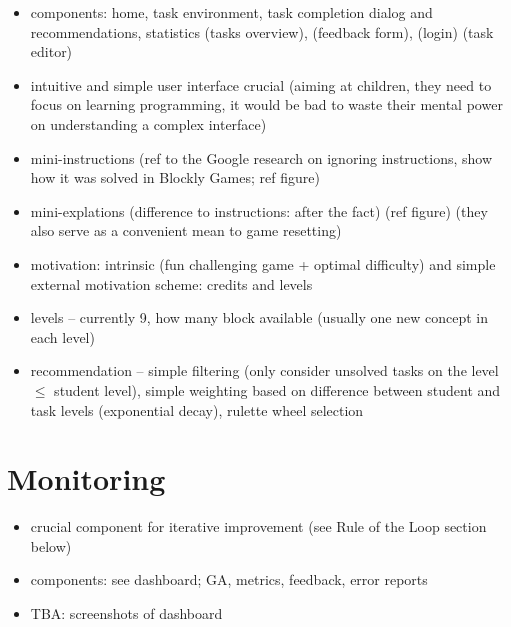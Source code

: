 \begin{itemize}
\item components: home, task environment, task completion dialog and recommendations, statistics (tasks overview), (feedback form), (login) (task editor)
\item intuitive and simple user interface crucial (aiming at children, they need to focus on learning programming, it would be bad to waste their mental power on understanding a complex interface)
\item mini-instructions (ref to the Google research on ignoring instructions, show how it was solved in Blockly Games; ref figure)
\item mini-explations (difference to instructions: after the fact) (ref figure) (they also serve as a convenient mean to game resetting)
\item motivation: intrinsic (fun challenging game + optimal difficulty) and simple external motivation scheme: credits and levels
\item levels -- currently 9, how many block available (usually one new concept in each level)
\item recommendation -- simple filtering (only consider unsolved tasks on the level $\leq$ student level), simple weighting based on difference between student and task levels (exponential decay), rulette wheel selection
\end{itemize}





\section{Monitoring}
\label{sec:robomission.monitoring}

\begin{itemize}
\item crucial component for iterative improvement (see Rule of the Loop section below)
\item components: see dashboard; GA, metrics, feedback, error reports
\item TBA: screenshots of dashboard
\end{itemize}


